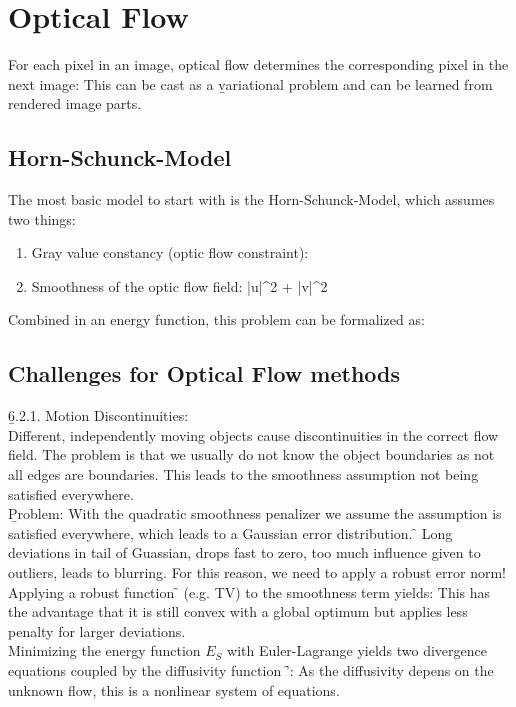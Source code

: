 \section{Optical Flow}
For each pixel in an image, optical flow determines the corresponding pixel in the next image: 
This can be cast as a \b{variational problem} and can be learned from rendered image parts.

\subsection{Horn-Schunck-Model}
The most basic model to start with is the Horn-Schunck-Model, which assumes two things:
\begin{enumerate}
    \item Gray value constancy (optic flow constraint):
    \item Smoothness of the optic flow field:
    \f{
        \quad|\nabla u|^2 + |\nabla v|^2 \to \min
    }
\end{enumerate}
Combined in an energy function, this problem can be formalized as:

\subsection{Challenges for Optical Flow methods}
\b{6.2.1. Motion Discontinuities:\\[0.5em]}
Different, independently moving objects cause discontinuities in the correct flow field. The problem is that we usually do not know the object boundaries as not all edges are boundaries. This leads to the smoothness assumption not being satisfied everywhere.\\

\b{Problem:} With the quadratic smoothness penalizer we assume the assumption is satisfied everywhere, which leads to a Gaussian error distribution. \f{\to} Long deviations in tail of Guassian, drops fast to zero, too much influence given to outliers, leads to blurring. For this reason, we need to apply a robust error norm!\\

Applying a robust function \f{\Psi} (e.g. TV) to the smoothness term yields:
This has the advantage that it is still convex with a global optimum but applies less penalty for larger deviations.\\
Minimizing the energy function \(E_S\) with Euler-Lagrange yields two divergence equations coupled by the diffusivity function \f{\Psi'}:
As the diffusivity depens on the unknown flow, this is a nonlinear system of equations.\\

